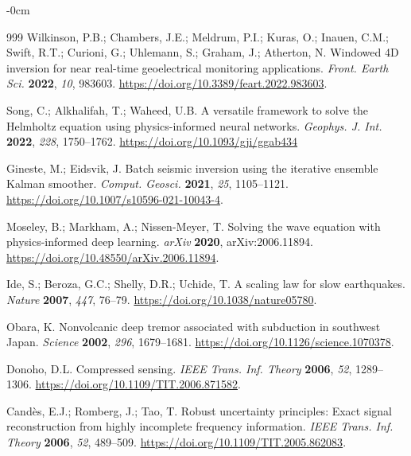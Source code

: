 \documentclass[data,article,accept,pdftex,moreauthors]{Definitions/mdpi}
\begin{document}
\begin{adjustwidth}{-\extralength}{0cm}
\begin{thebibliography}{999}
Wilkinson, P.B.; Chambers, J.E.; Meldrum, P.I.; Kuras, O.; Inauen, C.M.; Swift, R.T.; Curioni, G.; Uhlemann, S.; Graham, J.; Atherton, N. Windowed 4D inversion for near real-time geoelectrical monitoring applications. \emph{Front. Earth Sci.} \textbf{2022}, \emph{10}, 983603. \url{https://doi.org/10.3389/feart.2022.983603}.

Song, C.; Alkhalifah, T.; Waheed, U.B. A versatile framework to solve the Helmholtz equation using physics-informed neural networks. \emph{Geophys. J. Int.} \textbf{2022}, \emph{228}, 1750--1762. \url{https://doi.org/10.1093/gji/ggab434} %

Gineste, M.; Eidsvik, J. Batch seismic inversion using the iterative ensemble Kalman smoother. \emph{Comput. Geosci.} \textbf{2021}, \emph{25}, 1105--1121. \url{https://doi.org/10.1007/s10596-021-10043-4}.


Moseley, B.; Markham, A.; Nissen-Meyer, T. Solving the wave equation with physics-informed deep learning. \emph{arXiv} \textbf{2020}, arXiv:2006.11894. \url{https://doi.org/10.48550/arXiv.2006.11894}.

Ide, S.; Beroza, G.C.; Shelly, D.R.; Uchide, T. A scaling law for slow earthquakes. \emph{Nature} \textbf{2007}, \emph{447}, 76--79. \url{https://doi.org/10.1038/nature05780}.

Obara, K. Nonvolcanic deep tremor associated with subduction in southwest Japan. \emph{Science} \textbf{2002}, \emph{296}, 1679--1681. \url{https://doi.org/10.1126/science.1070378}.

Donoho, D.L. Compressed sensing. \emph{IEEE Trans. Inf. Theory} \textbf{2006}, \emph{52}, 1289--1306. \url{https://doi.org/10.1109/TIT.2006.871582}.

Candès, E.J.; Romberg, J.; Tao, T. Robust uncertainty principles: Exact signal reconstruction from highly incomplete frequency information. \emph{IEEE Trans. Inf. Theory} \textbf{2006}, \emph{52}, 489--509. \url{https://doi.org/10.1109/TIT.2005.862083}.


\end{thebibliography}
\end{adjustwidth}
\end{document}
